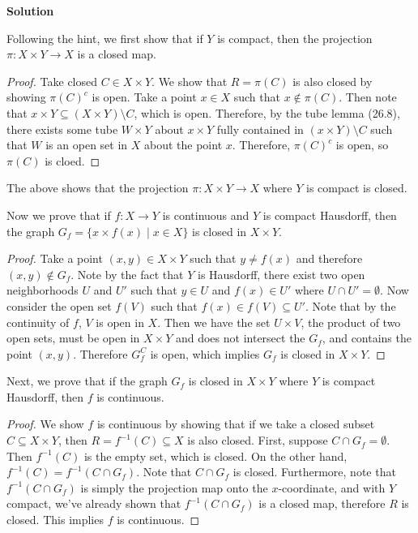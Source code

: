 \documentclass[12pt]{article}
\newcounter{AnswerCounter}
\newcounter{SubAnswerCounter}
\newenvironment{answer}[0]{
  \setcounter{SubAnswerCounter}{1}
  \bigskip
  \textbf{Solution \arabic{AnswerCounter}}
  \\
  \begin{small}
}{
  \end{small}
  \stepcounter{AnswerCounter}
}
\begin{document}
\begin{answer}[Page 171, \#7]
Following the hint, we first show that if $Y$ is compact, then the projection $\pi: X \times Y \to X$ is a closed map.
\begin{proof}
Take closed $C \in X \times Y$. We show that $R = \pi(C)$ is also closed by showing $\pi(C)^c$ is open. Take a point $x \in X$ such that $x \notin \pi(C)$. Then note that $x \times Y \subseteq (X \times Y) \setminus C$, which is open. Therefore, by the tube lemma (26.8), there exists some tube $W \times Y$ about $x \times Y$ fully contained in $(x \times Y) \setminus C$ such that $W$ is an open set in $X$ about the point $x$. Therefore, $\pi(C)^c$ is open, so $\pi(C)$ is cloed.
\end{proof}
The above shows that the projection $\pi: X \times Y \to X$ where $Y$ is compact is closed.

Now we prove that if $f: X \to Y$ is continuous and $Y$ is compact Hausdorff, then the graph $G_f = \{ x \times f(x) \mid x \in X\}$ is closed in $X \times Y$.
\begin{proof}
Take a point $(x,y) \in X \times Y$ such that $y \neq f(x)$ and therefore $(x,y) \notin G_f$. Note by the fact that $Y$ is Hausdorff, there exist two open neighborhoods $U$ and $U'$ such that $y \in U$ and $f(x) \in U'$ where $U \cap U' = \emptyset$. Now consider the open set $f(V)$ such that $f(x) \in f(V) \subseteq U'$. Note that by the continuity of $f$, $V$ is open in $X$. Then we have the set $U \times V$, the product of two open sets, must be open in $X \times Y$ and does not intersect the $G_f$, and contains the point $(x,y)$. Therefore $G_f^C$ is open, which implies $G_f$ is closed in $X \times Y$.
\end{proof}

Next, we prove that if the graph $G_f$ is closed in $X \times Y$ where $Y$ is compact Hausdorff, then $f$ is continuous.
\begin{proof}
We show $f$ is continuous by showing that if we take a closed subset $C \subseteq X \times Y$, then $R = f^{-1}(C) \subseteq X$ is also closed. First, suppose $C \cap G_f = \emptyset$. Then $f^{-1}(C)$ is the empty set, which is closed. On the other hand, $f^{-1}(C) = f^{-1}(C \cap G_f)$. Note that $C \cap G_f$ is closed. Furthermore, note that $f^{-1}(C \cap G_f)$ is simply the projection map onto the $x$-coordinate, and with $Y$ compact, we've already shown that $f^{-1}(C \cap G_f)$ is a closed map, therefore $R$ is closed. This implies $f$  is continuous.
\end{proof}
\end{answer}
\end{document}
